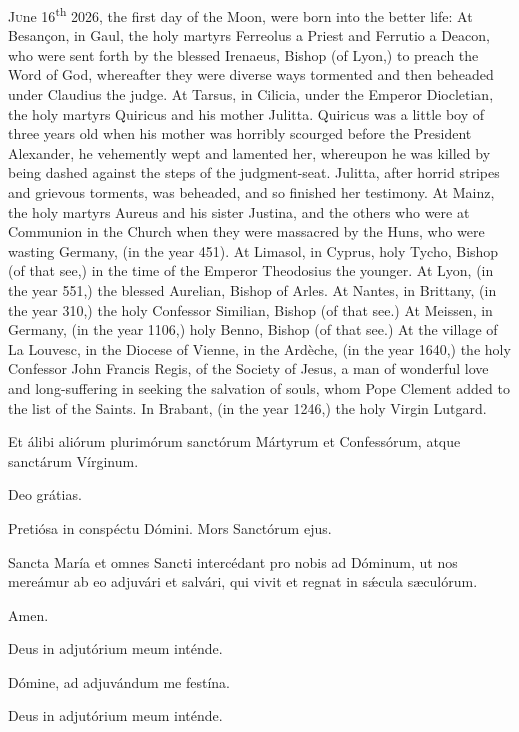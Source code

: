 \begin{enpars}
\lettrine[lraise=0.2]{J}{u}ne 16\textsuperscript{th} 2026, the first day of the Moon, were born into the better life:
At Besançon, in Gaul, the holy martyrs Ferreolus a Priest and Ferrutio a Deacon, who were sent forth by the blessed Irenaeus, Bishop (of Lyon,) to preach the Word of God, whereafter they were diverse ways tormented and then beheaded under Claudius the judge.
At Tarsus, in Cilicia, under the Emperor Diocletian, the holy martyrs Quiricus and his mother Julitta.
Quiricus was a little boy of three years old when his mother was horribly scourged before the President Alexander, he vehemently wept and lamented her, whereupon he was killed by being dashed against the steps of the judgment-seat. Julitta, after horrid stripes and grievous torments, was beheaded, and so finished her testimony.
At Mainz, the holy martyrs Aureus and his sister Justina, and the others who were at Communion in the Church when they were massacred by the Huns, who were wasting Germany, (in the year 451).
At Limasol, in Cyprus, holy Tycho, Bishop (of that see,) in the time of the Emperor Theodosius the younger.
At Lyon, (in the year 551,) the blessed Aurelian, Bishop of Arles.
At Nantes, in Brittany, (in the year 310,) the holy Confessor Similian, Bishop (of that see.)
At Meissen, in Germany, (in the year 1106,) holy Benno, Bishop (of that see.)
At the village of La Louvesc, in the Diocese of Vienne, in the Ardèche, (in the year 1640,) the holy Confessor John Francis Regis, of the Society of Jesus, a man of wonderful love and long-suffering in seeking the salvation of souls, whom Pope Clement  added to the list of the Saints.
In Brabant, (in the year 1246,) the holy Virgin Lutgard.
\end{enpars}

\vv Et álibi aliórum plurimórum sanctórum Mártyrum et Confessórum, atque sanctárum Vírginum.

\rr Deo grátias.

\vv Pretiósa in conspéctu Dómini. \rr Mors Sanctórum ejus.

Sancta María et omnes Sancti intercédant pro nobis ad Dóminum, ut nos
mereámur ab eo adjuvári et salvári, qui vivit et regnat in sǽcula sæculórum.

\rr Amen.

\vv Deus in adjutórium meum inténde.

\rr Dómine, ad adjuvándum me festína.

\vv Deus in adjutórium meum inténde.

